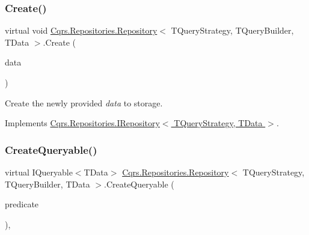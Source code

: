 \subsubsection{\texorpdfstring{Create()}{Create()}\hspace{0.1cm}{\footnotesize\ttfamily [2/2]}}
{\footnotesize\ttfamily virtual void \hyperlink{classCqrs_1_1Repositories_1_1Repository}{Cqrs.\+Repositories.\+Repository}$<$ T\+Query\+Strategy, T\+Query\+Builder, T\+Data $>$.Create (\begin{DoxyParamCaption}\item[{I\+Enumerable$<$ T\+Data $>$}]{data }\end{DoxyParamCaption})\hspace{0.3cm}{\ttfamily [virtual]}}



Create the newly provided {\itshape data}  to storage. 



Implements \hyperlink{interfaceCqrs_1_1Repositories_1_1IRepository_ae3481fb2ecb0146308e07a9dd6af8c14_ae3481fb2ecb0146308e07a9dd6af8c14}{Cqrs.\+Repositories.\+I\+Repository$<$ T\+Query\+Strategy, T\+Data $>$}.

\mbox{\label{classCqrs_1_1Repositories_1_1Repository_ab95fc66b24e8359a1e2f48a3ca2f14c1_ab95fc66b24e8359a1e2f48a3ca2f14c1}} 
\subsubsection{\texorpdfstring{Create\+Queryable()}{CreateQueryable()}}
{\footnotesize\ttfamily virtual I\+Queryable$<$T\+Data$>$ \hyperlink{classCqrs_1_1Repositories_1_1Repository}{Cqrs.\+Repositories.\+Repository}$<$ T\+Query\+Strategy, T\+Query\+Builder, T\+Data $>$.Create\+Queryable (\begin{DoxyParamCaption}\item[{Expression$<$ Func$<$ T\+Data, bool $>$$>$}]{predicate }\end{DoxyParamCaption})\hspace{0.3cm}{\ttfamily [protected]}, {\ttfamily [virtual]}}



